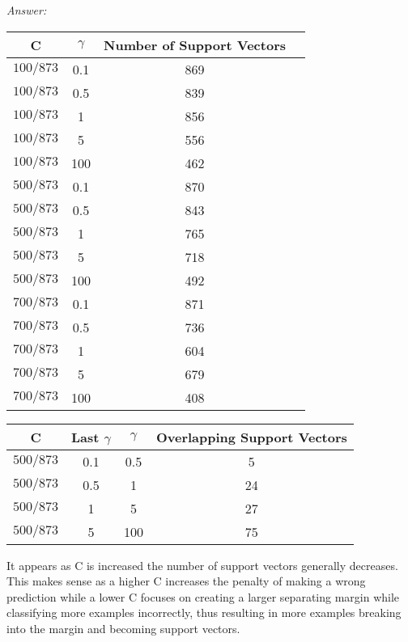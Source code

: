 \documentclass[12pt, fullpage,letterpaper]{article}
\begin{document}
\begin{enumerate}
\begin{enumerate}
	\textit{Answer:}

	\begin{center}
	\begin{tabular}{|c|c|c|c|}
		\hline
		C & $\gamma$ & Number of Support Vectors \\ 
		\hline
		$100/873$ & 0.1 & 869 \\
		\hline
		$100/873$ & 0.5 & 839 \\
		\hline
		$100/873$ & 1 & 856 \\
		\hline
		$100/873$ & 5 & 556 \\
		\hline
		$100/873$ & 100 & 462 \\
		\hline
		$500/873$ & 0.1 & 870 \\
		\hline
		$500/873$ & 0.5 & 843 \\
		\hline
		$500/873$ & 1 & 765 \\
		\hline
		$500/873$ & 5 & 718 \\
		\hline
		$500/873$ & 100 & 492 \\
		\hline
		$700/873$ & 0.1 & 871 \\
		\hline
		$700/873$ & 0.5 & 736 \\
		\hline
		$700/873$ & 1 & 604 \\
		\hline
		$700/873$ & 5 & 679 \\
		\hline
		$700/873$ & 100 & 408 \\
		\hline
	\end{tabular}
	\end{center}

	\begin{center}
	\begin{tabular}{|c|c|c|c|}
		\hline
		C & Last $\gamma$ & $\gamma$ & Overlapping Support Vectors \\ 
		\hline
		$500/873$ & 0.1 & 0.5 & 5 \\
		\hline
		$500/873$ & 0.5 & 1 & 24 \\
		\hline
		$500/873$ & 1 & 5 & 27 \\
		\hline
		$500/873$ & 5 & 100 & 75 \\
		\hline
	\end{tabular}
	\end{center}

	It appears as C is increased the number of support vectors generally decreases.
	This makes sense as a higher C increases the penalty of making a wrong prediction while a lower C focuses on creating a larger separating margin while classifying more examples incorrectly, thus resulting in more examples breaking into the margin and becoming support vectors.


\end{enumerate}
\end{enumerate}
\end{document}
